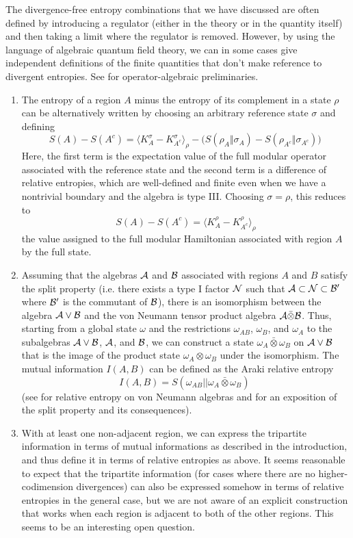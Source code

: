 \documentclass[12pt]{article}
\theoremstyle{definition}
\begin{document}
The divergence-free entropy combinations that we have discussed are often defined by introducing a regulator (either in the theory or in the quantity itself) and then taking a limit where the regulator is removed. However, by using the language of algebraic quantum field theory, we can in some cases give independent definitions of the finite quantities that don't make reference to divergent entropies. See \cite{Haag1996, BratteliRobinson1997} for operator-algebraic preliminaries.
\begin{enumerate}
    \item The entropy of a region $A$ minus the entropy of its complement in a state $\rho$ can be alternatively written by choosing an arbitrary reference state $\sigma$ and defining 
    \[
S(A)-S(A^{c})
=\big\langle K^{\sigma}_{A}-K^{\sigma}_{A^{c}}\big\rangle_{\rho}
-\Big(S(\rho_A\Vert\sigma_A)-S(\rho_{A^{c}}\Vert\sigma_{A^{c}})\Big)\,%
\]
Here, the first term is the expectation value of the full modular operator associated with the reference state and the second term is a difference of relative entropies, which are well-defined and finite even when we have a nontrivial boundary and the algebra is type III. Choosing $\sigma = \rho$, this reduces to
\[
S(A)-S(A^{c})
=\big\langle K^{\rho}_{A}-K^{\rho}_{A^{c}}\big\rangle_{\rho}
\]
the value assigned to the full modular Hamiltonian associated with region $A$ by the full state.
    \item 
    Assuming that the algebras ${\cal A}$ and ${\cal B}$ associated with regions $A$ and $B$ satisfy the split property (i.e. there exists a type I factor ${\cal N}$ such that ${\cal A} \subset {\cal N} \subset {\cal B}'$ where ${\cal B}'$ is the commutant of ${\cal B}$), there is an isomorphism between the algebra ${\cal A} \vee {\cal B}$ and the von Neumann tensor product algebra ${\cal A} \bar{\otimes} {\cal B}$. Thus, starting from a global state $\omega$ and the restrictions $\omega_{AB}$, $\omega_B$, and $\omega_A$ to the subalgebras ${\cal A} \vee {\cal B}$, ${\cal A}$, and ${\cal B}$, we can construct a state $\omega_A \bar{\otimes} \omega_B$ on ${\cal A} \vee {\cal B}$ that is the image of the product state $\omega_A \otimes \omega_B$ under the isomorphism. The mutual information $I(A,B)$ can be defined as the Araki relative entropy
    \[
    I(A,B) =S(\omega_{AB}|| \omega_A \bar{\otimes} \omega_B) \; 
    \]
    (see \cite{Araki1976} for relative entropy on von Neumann algebras and \cite{Fewster2016} for an exposition of the split property and its consequences).
    \item 
    With at least one non-adjacent region, we can express the tripartite information in terms of mutual informations as described in the introduction, and thus define it in terms of relative entropies as above. It seems reasonable to expect that the tripartite information (for cases where there are no higher-codimension divergences) can also be expressed somehow in terms of relative entropies in the general case, but we are not aware of an explicit construction that works when each region is adjacent to both of the other regions. This seems to be an interesting open question.
\end{enumerate}
\end{document}
